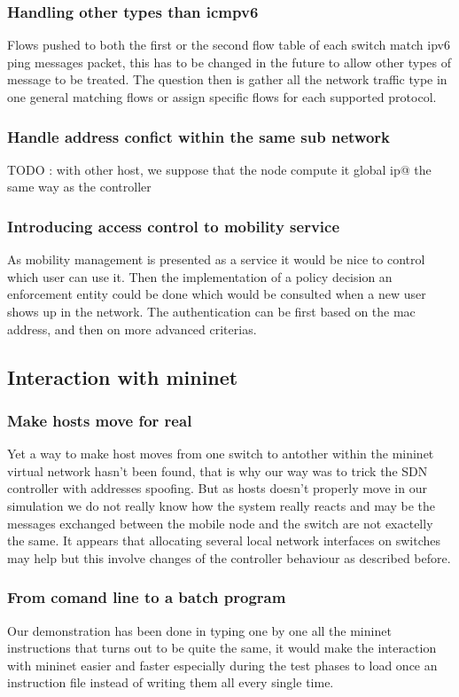 \documentclass{article}
\begin{document}
\subsubsection{Handling other types than icmpv6}
Flows pushed to both the first or the second flow table of each switch
match ipv6 ping messages packet, this has to be changed in the future
to allow other types of message to be treated. The question then is
gather all the network traffic type in one general matching flows or
assign specific flows for each supported protocol.


\subsubsection{Handle address confict within the same sub network}
    TODO : with other host, we suppose that the node compute it global ip@
    the same way as the controller

\subsubsection{Introducing access control to mobility service}
As mobility management is presented as a service it would be nice to
control which user can use it. Then the implementation of a policy
decision an enforcement entity could be done which would be consulted
when a new user shows up in the network. The authentication can be
first based on the mac address, and then on more advanced criterias. 

\subsection{Interaction with mininet}

\subsubsection{Make hosts move for real}
Yet a way to make host moves from one switch to antother within the
mininet virtual network hasn't been found, that is why our way was to
trick the SDN controller with addresses spoofing. But as hosts doesn't
properly move in our simulation we do not really know how the system
really reacts and may be the messages exchanged between the mobile
node and the switch are not exactelly the same. It appears that
allocating several local network interfaces on switches may help but
this involve changes of the controller behaviour as described
before.

\subsubsection{From comand line to a batch program}
Our demonstration has been done in typing one by one all the mininet
instructions that turns out to be quite the same, it would make the
interaction with mininet easier and faster especially during the test
phases to load once an instruction file instead of writing them all
every single time. 
 
\end{document}
